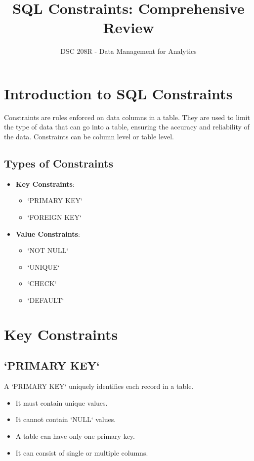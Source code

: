 \documentclass{article}
\title{SQL Constraints: Comprehensive Review}
\author{DSC 208R - Data Management for Analytics}
\date{}
\begin{document}
\maketitle

\section*{Introduction to SQL Constraints}
Constraints are rules enforced on data columns in a table. They are used to limit the type of data that can go into a table, ensuring the accuracy and reliability of the data. Constraints can be column level or table level.

\subsection*{Types of Constraints}
\begin{itemize}
    \item \textbf{Key Constraints}:
        \begin{itemize}
            \item `PRIMARY KEY` 
            \item `FOREIGN KEY` 
        \end{itemize}
    \item \textbf{Value Constraints}:
        \begin{itemize}
            \item `NOT NULL` 
            \item `UNIQUE` 
            \item `CHECK` 
            \item `DEFAULT` 
        \end{itemize}
\end{itemize}

\section*{Key Constraints}

\subsection*{`PRIMARY KEY`}
A `PRIMARY KEY` uniquely identifies each record in a table.
\begin{itemize}
    \item It must contain unique values.
    \item It cannot contain `NULL` values.
    \item A table can have only one primary key.
    \item It can consist of single or multiple columns.
\end{itemize}
\end{document}

